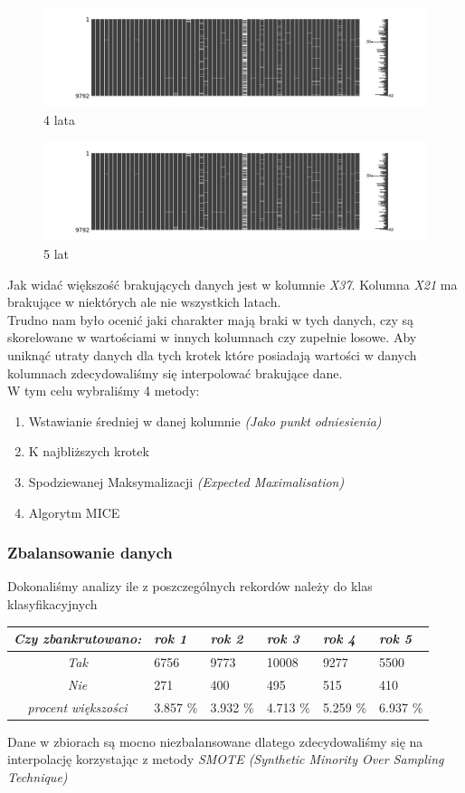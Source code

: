\documentclass[11pt]{article}
\begin{document}
\begin{figure}[h]
\caption{4 lata}
	\includegraphics[width=\textwidth]{year_4}
\end{figure}

\begin{figure}[h]
\caption{5 lat}
	\includegraphics[width=\textwidth]{year_5}
\end{figure}

Jak widać większość brakujących danych jest w kolumnie \textit{X37}. Kolumna \textit{X21} ma brakujące w niektórych ale nie wszystkich latach.\\
Trudno nam było ocenić jaki charakter mają braki w tych danych, czy są skorelowane w wartościami w innych kolumnach czy zupełnie losowe. Aby uniknąć utraty danych dla tych krotek które posiadają wartości w danych kolumnach zdecydowaliśmy się interpolować brakujące dane.\\
W tym celu wybraliśmy 4 metody:
\begin{enumerate}
	\item Wstawianie średniej w danej kolumnie \textit{(Jako punkt odniesienia)}
	\item K najbliższych krotek
	\item Spodziewanej Maksymalizacji \textit{(Expected Maximalisation)}
	\item Algorytm MICE
\end{enumerate}
\subsubsection{Zbalansowanie danych}
Dokonaliśmy analizy ile z poszczególnych rekordów należy do klas klasyfikacyjnych
\begin{center}
	\begin{tabular}{|c|m{0.7in}|m{0.7in}|m{0.7in}|m{0.7in}|m{0.7in}|}
		\hline
		\textit{Czy zbankrutowano:}& \textit{rok 1} & \textit{rok 2} & \textit{rok 3} & \textit{rok 4} & \textit{rok 5} \\ \hline
		\textit{Tak} & 6756 & 9773 & 10008 & 9277 & 5500 \\ \hline
		\textit{Nie} & 271 & 400 & 495 & 515 & 410 \\ \hline \hline
		\textit{procent większości} & 3.857 \% & 3.932 \% & 4.713 \% & 5.259 \% & 6.937 \% \\ \hline
	\end{tabular}
\end{center}
Dane w zbiorach są mocno niezbalansowane dlatego zdecydowaliśmy się na interpolację korzystając z metody \textit{SMOTE (Synthetic Minority Over Sampling Technique)}
\end{document}
